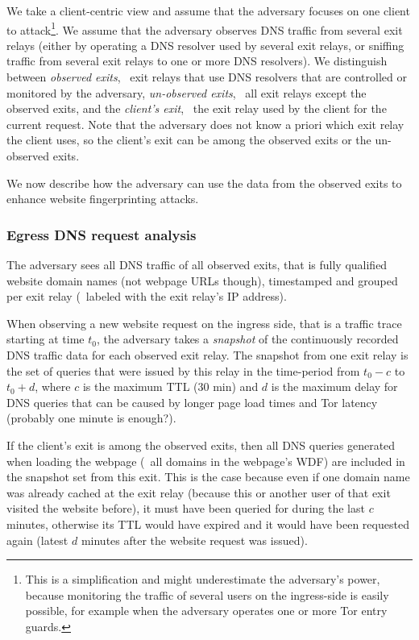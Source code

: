 We take a client-centric view and assume that the adversary focuses on
one client to attack\footnote{This is a simplification and might
underestimate the adversary's power, because monitoring the traffic of
several users on the ingress-side is easily possible, for example when
the adversary operates one or more Tor entry guards.}.
%
We assume that the adversary observes DNS traffic from several exit
relays (either by operating a DNS resolver used by several exit relays,
or sniffing traffic from several exit relays to one or more DNS
resolvers).
%
We distinguish between \emph{observed exits}, \ie~exit relays that use
DNS resolvers that are controlled or monitored by the adversary,
\emph{un-observed exits}, \ie~all exit relays except the observed exits,
and the \emph{client's exit}, \ie~the exit relay used by the client for
the current request.
%
Note that the adversary does not know a priori which exit relay the
client uses, so the client's exit can be among the observed exits or the
un-observed exits.

%
We now describe how the adversary can use the data from the observed
exits to enhance website fingerprinting attacks.


\subsubsection{Egress DNS request analysis}

The adversary sees all DNS traffic of all observed exits, that is fully
qualified website domain names (not webpage URLs though), timestamped
and grouped per exit relay (\eg~labeled with the exit relay's IP
address).

When observing a new website request on the ingress side, that is a
traffic trace starting at time $t_0$, the adversary takes a
\emph{snapshot} of the continuously recorded DNS traffic data for each
observed exit relay. The snapshot from one exit relay is the set of
queries that were issued by this relay in the time-period from $t_0 - c$
to $t_0 + d$, where $c$ is the maximum TTL (30 min) and $d$ is the
maximum delay for DNS queries that can be caused by longer page load
times and Tor latency (probably one minute is enough?).

If the client's exit is among the observed exits, then all DNS queries
generated when loading the webpage (\ie~all domains in the webpage's
WDF) are included in the snapshot set from this exit. This is the case
because even if one domain name was already cached at the exit relay
(because this or another user of that exit visited the website before),
it must have been queried for during the last $c$ minutes, otherwise its
TTL would have expired and it would have been requested again (latest
$d$ minutes after the website request was issued).

